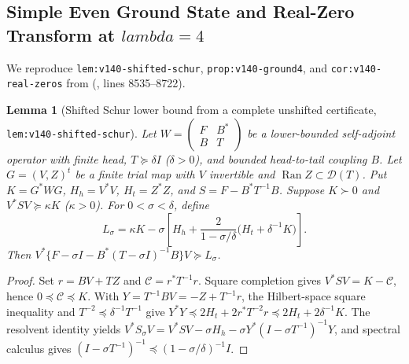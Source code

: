 \documentclass[11pt]{article}
\def\lambda{lambda}%
\newtheorem{lemma}[theorem]{Lemma}
\theoremstyle{remark}
\begin{document}
\subsection{Simple Even Ground State and Real-Zero Transform at \texorpdfstring{$\lambda = 4$}{lambda = 4}}
We reproduce \texttt{lem:v140-\allowbreak shifted-\allowbreak schur}, \texttt{prop:v140-\allowbreak ground4}, and \texttt{cor:v140-\allowbreak real-\allowbreak zeros} from  (, lines 8535--8722).

\begin{lemma}[Shifted Schur lower bound from a complete unshifted certificate, \texttt{lem:v140-\allowbreak shifted-\allowbreak schur}]
\label{lem:v140-shifted-schur}
Let $W = \left(\begin{smallmatrix} F & B^* \\ B & T \end{smallmatrix}\right)$ be a lower-bounded self-adjoint operator with finite head, $T \succeq \delta I$ ($\delta > 0$), and bounded head-to-tail coupling $B$. Let $G = (V, Z)^t$ be a finite trial map with $V$ invertible and $\operatorname{Ran} Z \subset \mathcal{D}(T)$. Put $K = G^* W G$, $H_h = V^* V$, $H_t = Z^* Z$, and $S = F - B^* T^{-1} B$. Suppose $K \succ 0$ and $V^* S V \succeq \kappa K$ ($\kappa > 0$). For $0 < \sigma < \delta$, define
\begin{equation}\label{eq:v140-shifted-lower}
  L_\sigma = \kappa K - \sigma\left[H_h + \frac{2}{1 - \sigma/\delta}\bigl(H_t + \delta^{-1}K\bigr)\right].
\end{equation}
Then $V^*\{F - \sigma I - B^*(T - \sigma I)^{-1}B\}V \succeq L_\sigma$.
\end{lemma}
\begin{proof}
Set $r = BV + TZ$ and $\mathcal{C} = r^* T^{-1} r$. Square completion gives $V^* S V = K - \mathcal{C}$, hence $0 \preceq \mathcal{C} \preceq K$. With $Y = T^{-1} B V = -Z + T^{-1} r$, the Hilbert-space square inequality and $T^{-2} \preceq \delta^{-1} T^{-1}$ give $Y^* Y \preceq 2H_t + 2r^* T^{-2} r \preceq 2H_t + 2\delta^{-1}K$. The resolvent identity yields $V^* S_\sigma V = V^* S V - \sigma H_h - \sigma Y^*(I - \sigma T^{-1})^{-1}Y$, and spectral calculus gives $(I - \sigma T^{-1})^{-1} \preceq (1 - \sigma/\delta)^{-1}I$.
\end{proof}
\end{document}
